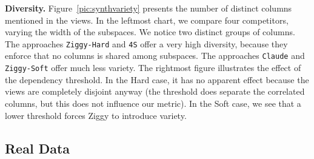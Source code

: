 \textbf{Diversity.} Figure~\ref{pic:synthvariety} presents the number of
distinct co\-lumns mentioned in the views. In the leftmost
chart, we compare four competitors, varying the width of the subspaces. We
notice two distinct groups of columns. The approaches \texttt{Ziggy-Hard} and
\texttt{4S} offer a very high diversity, because they enforce that no columns
is shared among subspaces. The approaches \texttt{Claude} and
\texttt{Ziggy-Soft} offer much less variety. The rightmost figure illustrates
the effect of the dependency threshold. In the Hard case, it has no apparent
effect because the views are completely disjoint anyway (the threshold  does
separate the correlated columns, but this does not influence our metric). In
the Soft case, we see that a lower threshold forces Ziggy to introduce variety.


\subsection{Real Data}
\label{sec:realdata}

